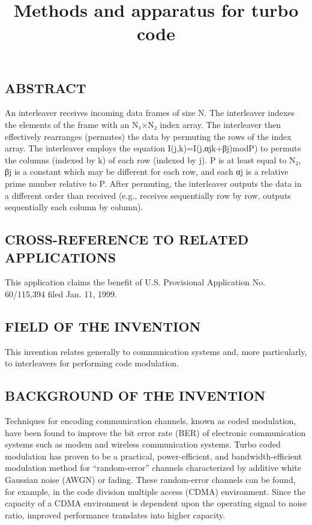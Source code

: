 \documentclass[11pt,a4paper]{article}
\title{Methods and apparatus for turbo code}
\begin{document}
\maketitle

\subsection{ABSTRACT}

An interleaver receives incoming data frames of size N. The interleaver indexes the elements of the frame with an N₁×N₂ index array. The interleaver then effectively rearranges (permutes) the data by permuting the rows of the index array. The interleaver employs the equation I(j,k)=I(j,αjk+βj)modP) to permute the columns (indexed by k) of each row (indexed by j). P is at least equal to N₂, βj is a constant which may be different for each row, and each αj is a relative prime number relative to P. After permuting, the interleaver outputs the data in a different order than received (e.g., receives sequentially row by row, outputs sequentially each column by column).

\subsection{CROSS-REFERENCE TO RELATED APPLICATIONS}

This application claims the benefit of U.S. Provisional Application No. 60/115,394 filed Jan. 11, 1999.

\subsection{FIELD OF THE INVENTION}

This invention relates generally to communication systems and, more particularly, to interleavers for performing code modulation.

\subsection{BACKGROUND OF THE INVENTION}

Techniques for encoding communication channels, known as coded modulation, have been found to improve the bit error rate (BER) of electronic communication systems such as modem and wireless communication systems. Turbo coded modulation has proven to be a practical, power-efficient, and bandwidth-efficient modulation method for “random-error” channels characterized by additive white Gaussian noise (AWGN) or fading. These random-error channels can be found, for example, in the code division multiple access (CDMA) environment. Since the capacity of a CDMA environment is dependent upon the operating signal to noise ratio, improved performance translates into higher capacity.
\end{document}

